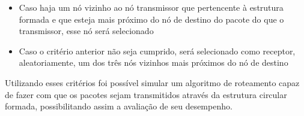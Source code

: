\begin{itemize}
\item Caso haja um nó vizinho ao nó transmissor que pertencente à estrutura formada e que esteja mais próximo do nó de destino do pacote do que o transmissor, esse nó será selecionado
\item Caso o critério anterior não seja cumprido, será selecionado como receptor, aleatoriamente, um dos três nós vizinhos mais próximos do nó de destino
\end{itemize}

Utilizando esses critérios foi possível simular um algoritmo de roteamento capaz de fazer com que os pacotes sejam transmitidos através da estrutura circular formada, possibilitando assim a avaliação de seu desempenho.



